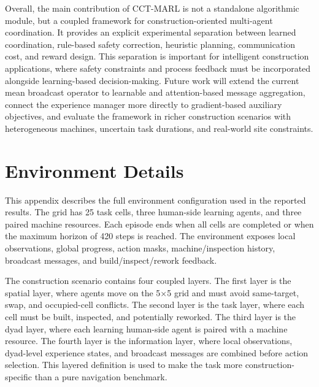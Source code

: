 \documentclass[fleqn,10pt]{wlpeerj}
\begin{document}
Overall, the main contribution of CCT-MARL is not a standalone algorithmic module, but a coupled framework for construction-oriented multi-agent coordination. It provides an explicit experimental separation between learned coordination, rule-based safety correction, heuristic planning, communication cost, and reward design. This separation is important for intelligent construction applications, where safety constraints and process feedback must be incorporated alongside learning-based decision-making. Future work will extend the current mean broadcast operator to learnable and attention-based message aggregation, connect the experience manager more directly to gradient-based auxiliary objectives, and evaluate the framework in richer construction scenarios with heterogeneous machines, uncertain task durations, and real-world site constraints.
\appendix

\section{Environment Details}

This appendix describes the full environment configuration used in the reported results. The grid has 25 task cells, three human-side learning agents, and three paired machine resources. Each episode ends when all cells are completed or when the maximum horizon of 420 steps is reached. The environment exposes local observations, global progress, action masks, machine/inspection history, broadcast messages, and build/inspect/rework feedback.

The construction scenario contains four coupled layers. The first layer is the spatial layer, where agents move on the 5$\times$5 grid and must avoid same-target, swap, and occupied-cell conflicts. The second layer is the task layer, where each cell must be built, inspected, and potentially reworked. The third layer is the dyad layer, where each learning human-side agent is paired with a machine resource. The fourth layer is the information layer, where local observations, dyad-level experience states, and broadcast messages are combined before action selection. This layered definition is used to make the task more construction-specific than a pure navigation benchmark.
\end{document}
